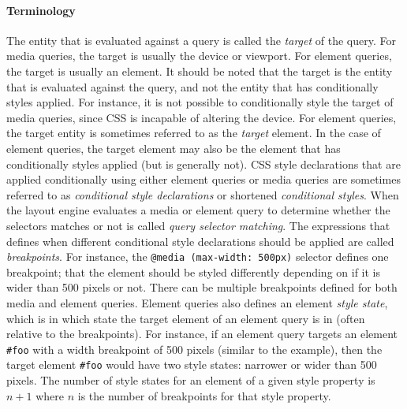 \documentclass[a4paper,11pt]{kth-mag}
\newcommand{\code}[1]{\texttt{#1}}
\begin{document}
      \paragraph{Terminology}
      The entity that is evaluated against a query is called the \emph{target} of the query.
      For \gls{media queries}, the target is usually the device or \gls{viewport}.
      For element queries, the target is usually an \gls{element}.
      It should be noted that the target is the entity that is evaluated against the query, and not the entity that has conditionally styles applied.
      For instance, it is not possible to conditionally style the target of \gls{media queries}, since \gls{CSS} is incapable of altering the device.
      For element queries, the target entity is sometimes referred to as the \emph{target} \gls{element}.
      In the case of element queries, the target element may also be the element that has conditionally styles applied (but is generally not).
      \gls{CSS} style declarations that are applied conditionally using either element queries or \gls{media queries} are sometimes referred to as \emph{conditional style declarations} or shortened \emph{conditional styles}.
      When the \gls{layout engine} evaluates a media or element query to determine whether the selectors matches or not is called \emph{query selector matching}.
      The expressions that defines when different conditional style declarations should be applied are called \emph{breakpoints}.
      For instance, the  \code{@media (max-width: 500px)} selector defines one breakpoint; that the element should be styled differently depending on if it is wider than 500 pixels or not.
      There can be multiple breakpoints defined for both media and element queries.
      Element queries also defines an element \emph{style state}, which is in which state the target element of an element query is in (often relative to the breakpoints).
      For instance, if an element query targets an element \code{\#foo} with a width breakpoint of 500 pixels (similar to the  example), then the target element \code{\#foo} would have two style states: narrower or wider than 500 pixels.
      The number of style states for an element of a given style property is $n + 1$ where $n$ is the number of breakpoints for that style property.
\end{document}
